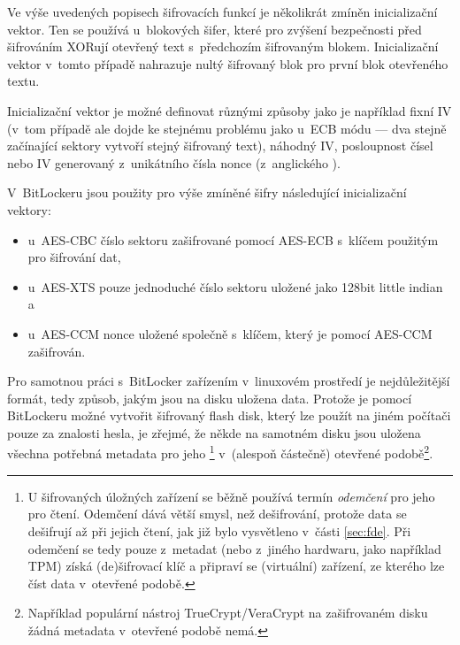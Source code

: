 \label{sec:iv}

Ve výše uvedených popisech šifrovacích funkcí je několikrát zmíněn inicializační vektor. Ten se používá u~blokových šifer, které pro zvýšení bezpečnosti před šifrováním XORují otevřený text s~předchozím šifrovaným blokem. Inicializační vektor v~tomto případě nahrazuje nultý šifrovaný blok pro první blok otevřeného textu.

Inicializační vektor je možné definovat různými způsoby jako je například fixní IV (v~tom případě ale dojde ke stejnému problému jako u~ECB módu --- dva stejně začínající sektory vytvoří stejný šifrovaný text), náhodný IV, posloupnost čísel nebo IV generovaný z~unikátního čísla nonce (z~anglického ).\cite{Kohnoc2010}

V~BitLockeru jsou použity pro výše zmíněné šifry následující inicializační vektory:
\begin{itemize}
	\item u~AES-CBC číslo sektoru zašifrované pomocí AES-ECB s~klíčem použitým pro šifrování dat,
	\item u~AES-XTS pouze jednoduché číslo sektoru uložené jako 128bit little indian a
	\item u~AES-CCM nonce uložené společně s~klíčem, který je pomocí AES-CCM zašifrován. \cite{Metz2011}
\end{itemize}


Pro samotnou práci s~BitLocker zařízením v~linuxovém prostředí je nejdůležitější formát, tedy způsob, jakým jsou na disku uložena data. Protože je pomocí BitLockeru možné vytvořit šifrovaný flash disk, který lze použít na jiném počítači pouze za znalosti hesla, je zřejmé, že někde na samotném disku jsou uložena všechna potřebná metadata pro jeho \footnote{U šifrovaných úložných zařízení se běžně používá termín \emph{odemčení} pro jeho  pro čtení. Odemčení dává větší smysl, než dešifrování, protože data se dešifrují až při jejich čtení, jak již bylo vysvětleno v~části \ref{sec:fde}. Při odemčení se tedy pouze z~metadat (nebo z~jiného hardwaru, jako například TPM) získá (de)šifrovací klíč a připraví se (virtuální) zařízení, ze kterého lze číst data v~otevřené podobě.} v~(alespoň částečně) otevřené podobě\footnote{Například populární nástroj TrueCrypt/VeraCrypt na zašifrovaném disku žádná metadata v~otevřené podobě nemá.\cite{Broz20141}}.

